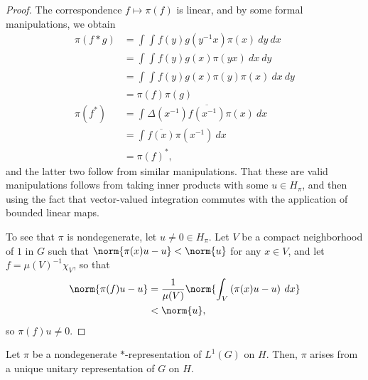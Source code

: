 \documentclass[12pt]{mypackage}
\begin{document}
\begin{proof}
  The correspondence $f\mapsto \pi(f)$ is linear, and by some formal manipulations, we obtain
  \begin{align*}
    \pi\left( f\ast g \right) &= \int_{}^{} \int_{}^{} f\left( y \right)g\left( y^{-1}x \right)\pi(x)\:dy\:dx\\
                              &= \int_{}^{} \int_{}^{} f\left( y \right)g\left( x \right)\pi\left( yx \right)\:dx\:dy\\
                              &= \int_{}^{} \int_{}^{} f\left( y \right)g\left( x \right)\pi\left( y \right)\pi\left( x \right)\:dx\:dy\\
                              &= \pi(f)\pi(g)\\
    \pi\left( f^{\ast} \right) &= \int_{}^{} \Delta\left( x^{-1} \right) \overline{f\left( x^{-1} \right)} \pi(x)\:dx\\
                               &= \int_{}^{} \overline{f(x)}\pi\left( x^{-1} \right)\:dx\\
                               &= \pi\left( f \right)^{\ast},
  \end{align*}
  and the latter two follow from similar manipulations. That these are valid manipulations follows from taking inner products with some $u\in H_{\pi}$, and then using the fact that vector-valued integration commutes with the application of bounded linear maps.

  To see that $\pi$ is nondegenerate, let $u\neq 0\in H_{\pi}$. Let $V$ be a compact neighborhood of $1$ in $G$ such that $\norm{\pi(x)u-u} < \norm{u}$ for any $x\in V$, and let $f = \mu(V)^{-1}\chi_V$, so that
  \begin{align*}
    \norm{\pi(f)u-u} &= \frac{1}{\mu(V)} \norm{ \int_{V}^{} \left( \pi(x)u-u \right)\:dx }\\
                     &< \norm{u},
  \end{align*}
  so $\pi(f)u\neq 0$.
\end{proof}
\begin{theorem}
  Let $\pi$ be a nondegenerate $\ast$-representation of $L^1(G)$ on $H$. Then, $\pi$ arises from a unique unitary representation of $G$ on $H$.
\end{theorem}
\end{document}
